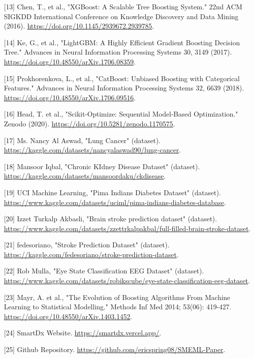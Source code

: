 \documentclass{article}
\begin{document}
{[13] Chen, T., et al., "XGBoost: A Scalable Tree Boosting System." 22nd ACM SIGKDD International Conference on Knowledge Discovery and Data Mining (2016). \url{https://doi.org/10.1145/2939672.2939785}.

[14] Ke, G., et al., "LightGBM: A Highly Efficient Gradient Boosting Decision Tree." Advances in Neural Information Processing Systems 30, 3149 (2017). \url{https://doi.org/10.48550/arXiv.1706.08359}.

[15] Prokhorenkova, L., et al., "CatBoost: Unbiased Boosting with Categorical Features." Advances in Neural Information Processing Systems 32, 6639 (2018). \url{https://doi.org/10.48550/arXiv.1706.09516}.

[16] Head, T. et al., "Scikit-Optimize: Sequential Model-Based Optimization." Zenodo (2020). \url{https://doi.org/10.5281/zenodo.1170575}.

[17] Ms. Nancy Al Aswad, "Lung Cancer" (dataset). \url{https://kaggle.com/datasets/nancyalaswad90/lung-cancer}.

[18] Mansoor Iqbal, "Chronic KIdney Disease Dataset" (dataset). \url{https://kaggle.com/datasets/mansoordaku/ckdisease}.

[19] UCI Machine Learning, "Pima Indians Diabetes Dataset" (dataset). \url{https://www.kaggle.com/datasets/uciml/pima-indians-diabetes-database}.

[20] Izzet Turkalp Akbasli, "Brain stroke prediction dataset" (dataset). \url{https://www.kaggle.com/datasets/zzettrkalpakbal/full-filled-brain-stroke-dataset}.

[21] fedesoriano, "Stroke Prediction Dataset" (dataset). \url{https://kaggle.com/fedesoriano/stroke-prediction-dataset}.

[22] Rob Mulla, "Eye State Classification EEG Dataset" (dataset). \url{https://www.kaggle.com/datasets/robikscube/eye-state-classification-eeg-dataset}.

[23] Mayr, A. et al., "The Evolution of Boosting Algorithms From Machine Learning to Statistical Modelling." Methods Inf Med 2014; 53(06): 419-427. \url{https://doi.org/10.48550/arXiv.1403.1452}. 

[24] SmartDx Website. \url{https://smartdx.vercel.app/}. 

[25] Github Repository. \url{https://github.com/ericspring08/SMEML-Paper}.
}
\end{document}
